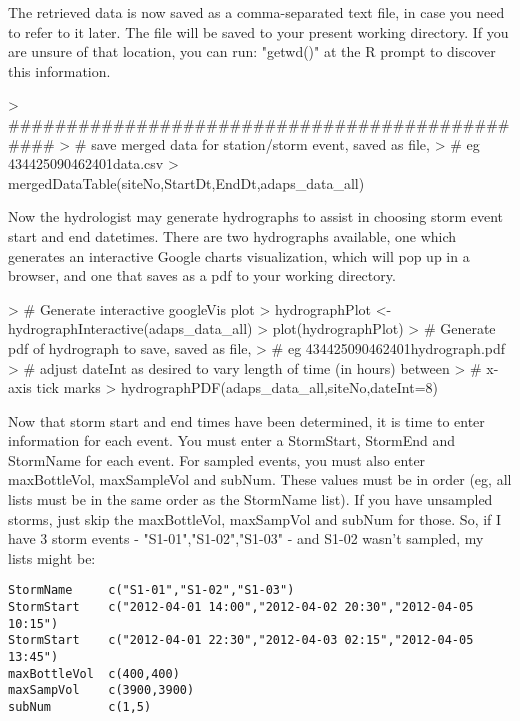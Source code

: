 \documentclass[a4paper,11pt]{article}
\begin{document}
The retrieved data is now saved as a comma-separated text file, in case you need to refer to it later. The file will be saved to your present working directory. If you are unsure of that location, you can run: "getwd()" at the R prompt to discover this information.

\begin{Schunk}
\begin{Sinput}
> ###############################################
> # save merged data for station/storm event, saved as file, 
> # eg 434425090462401data.csv 
> mergedDataTable(siteNo,StartDt,EndDt,adaps_data_all)
\end{Sinput}
\end{Schunk}

Now the hydrologist may generate hydrographs to assist in choosing storm event start and end datetimes. There are two hydrographs available, one which generates an interactive Google charts visualization, which will pop up in a browser, and one that saves as a pdf to your working directory.

\begin{Schunk}
\begin{Sinput}
> # Generate interactive googleVis plot
> hydrographPlot <- hydrographInteractive(adaps_data_all)
> plot(hydrographPlot)
> # Generate pdf of hydrograph to save, saved as file, 
> # eg 434425090462401hydrograph.pdf 
> # adjust dateInt as desired to vary length of time (in hours) between 
> # x-axis tick marks
> hydrographPDF(adaps_data_all,siteNo,dateInt=8)
\end{Sinput}
\end{Schunk}

Now that storm start and end times have been determined, it is time to enter information for each event. You must enter a StormStart, StormEnd and StormName for each event. For sampled events, you must also enter maxBottleVol, maxSampleVol and subNum. These values must be in order (eg, all lists must be in the same order as the StormName list). If you have unsampled storms, just skip the maxBottleVol, maxSampVol and subNum for those. So, if I have 3 storm events - "S1-01","S1-02","S1-03" - and S1-02 wasn't sampled, my lists might be:
\begin{verbatim}
StormName     c("S1-01","S1-02","S1-03")
StormStart    c("2012-04-01 14:00","2012-04-02 20:30","2012-04-05 10:15")
StormStart    c("2012-04-01 22:30","2012-04-03 02:15","2012-04-05 13:45")
maxBottleVol  c(400,400)
maxSampVol    c(3900,3900)
subNum        c(1,5)
\end{verbatim}
\end{document}
